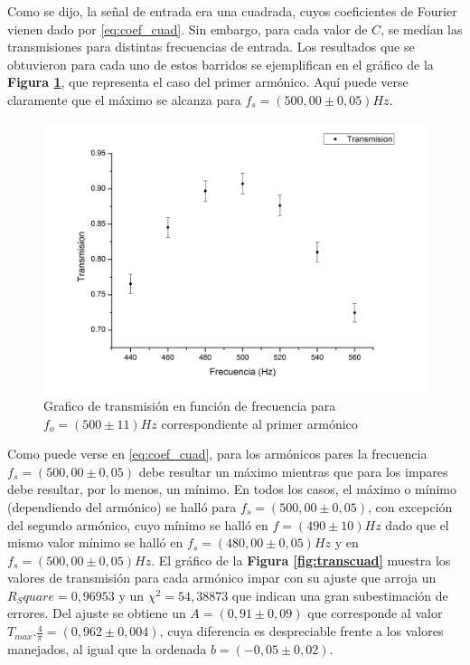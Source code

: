 \documentclass[11pt,a4paper]{article}
\begin{document}
Como se dijo, la señal de entrada era una cuadrada, cuyos coeficientes de Fourier vienen dado por \eqref{eq:coef_cuad}. Sin embargo, para cada valor de $C$, se medían las transmisiones para distintas frecuencias de entrada. Los resultados que se obtuvieron para cada uno de estos barridos se ejemplifican en el gráfico de la \textbf{Figura \ref{fig:armonico1cuad}}, que representa el caso del primer armónico. Aquí puede verse claramente que el máximo se alcanza para $f_s = (500,00 \pm 0,05)Hz$.

\begin{figure}[h]
\centering
\includegraphics[scale=0.6]{Trans_vs_Frec_Cuad1}
\caption{Grafico de transmisión en función de frecuencia para $f_o = (500 \pm 11)Hz$ correspondiente al primer armónico}
\label{fig:armonico1cuad}
\end{figure}

Como puede verse en \eqref{eq:coef_cuad}, para los armónicos pares la frecuencia $f_s = (500,00 \pm 0,05)$ debe resultar un máximo mientras que para los impares debe resultar, por lo menos, un mínimo. En todos los casos, el máximo o mínimo (dependiendo del armónico) se halló para $f_s = (500,00 \pm 0,05)$, con excepción del segundo armónico, cuyo mínimo se halló en $f = (490 \pm 10)Hz$ dado que el mismo valor mínimo se halló en $f_s = (480,00 \pm 0,05)Hz$ y en $f_s = (500,00 \pm 0,05)Hz$. El gráfico de la \textbf{Figura \ref{fig:transcuad}} muestra los valores de transmisión para cada armónico impar con su ajuste que arroja un $R_Square = 0,96953$ y un $\chi^2 = 54,38873$ que indican una gran subestimación de errores. Del ajuste se obtiene un $A = (0,91 \pm 0,09)$ que corresponde al valor $T_{max}.\frac{4}{\pi} = (0,962 \pm 0,004)$, cuya diferencia es despreciable frente a los valores manejados, al igual que la ordenada $b =(-0,05 \pm 0,02)$.
\end{document}
